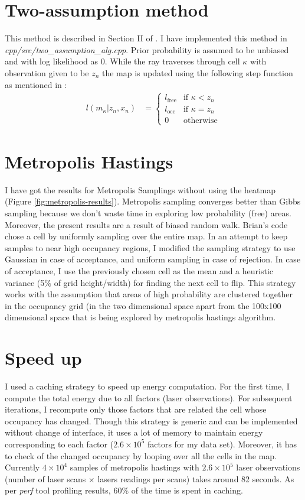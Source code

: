 \documentclass[10pt,oneside,letterpaper]{article}
\begin{document}
\section{Two-assumption method }
This method is described in Section II of \cite{merali2013icra}. I have implemented this method in \emph{cpp/src/two\_assumption\_alg.cpp}. Prior probability is assumed to be unbiased and with log likelihood as 0. While the ray traverses through cell $\kappa$ with observation given to be $z_n$ the map is updated using the following step function as mentioned in \cite{merali2013icra}:
\begin{align}
  l(m_{\kappa}|z_n, x_n) &= \begin{cases}
         l_{\text{free}} & \text{if $\kappa < z_n$}\\
          l_{\text{occ}} & \text{if $\kappa = z_n$}\\
                       0 & \text{otherwise}
  \end{cases}
\end{align}

\section{Metropolis Hastings}

I have got the results for Metropolis Samplings without using the heatmap
(Figure \ref{fig:metropolis-results}). Metropolis sampling converges better
than Gibbs sampling because we don't waste time in exploring low probability
(free) areas. Moreover, the present results are a result of biased random walk.
Brian's code chose a cell by uniformly sampling over the entire map. In an
attempt to keep samples to near high occupancy regions, I modified the sampling
strategy to use Gaussian in case of acceptance, and uniform sampling in case of
rejection. In case of acceptance, I use the previously chosen cell as the mean
and a heuristic variance (5\% of grid height/width) for finding the next cell
to flip. This strategy works with the assumption that areas of high probability
are clustered together in the occupancy grid (in the two dimensional space
apart from the 100x100 dimensional space that is being explored by metropolis
hastings algorithm.

\section{Speed up}

I used a caching strategy to speed up energy computation. For the first time, I
compute the total energy due to all factors (laser observations). For
subsequent iterations, I recompute only those factors that are related the cell
whose occupancy has changed. Though this strategy is generic and can be
implemented without change of interface, it uses a lot of memory to maintain
energy corresponding to each factor ($2.6 \times 10^5$ factors for my data
set). Moreover, it has to check of the changed occupancy by looping over all
the cells in the map. Currently $4 \times 10^4$ samples of metropolis hastings
with $2.6 \times 10^5$ laser observations (number of laser scans $\times$
lasers readings per scans) takes around 82 seconds. As per \emph{perf} tool
profiling results, 60\% of the time is spent in caching.
\end{document}
